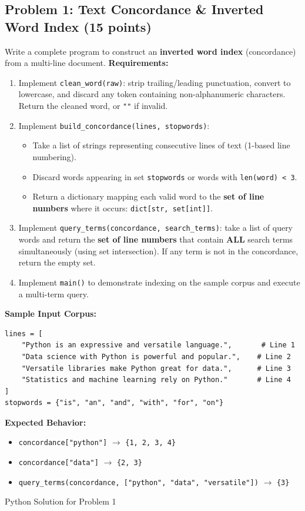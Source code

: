 \documentclass[11pt,a4paper]{article}
\begin{document}
\subsection*{Problem 1: Text Concordance \& Inverted Word Index (15 points)}
Write a complete program to construct an \textbf{inverted word index} (concordance) from a multi-line document.
\textbf{Requirements:}
\begin{enumerate}[label=\arabic*.,leftmargin=2em,itemsep=1.5pt]
\item Implement \texttt{clean\_word(raw)}: strip trailing/leading punctuation, convert to lowercase, and discard any token containing non-alphanumeric characters. Return the cleaned word, or \texttt{""} if invalid.
\item Implement \texttt{build\_concordance(lines, stopwords)}:
  \begin{itemize}
  \item Take a list of strings representing consecutive lines of text (1-based line numbering).
  \item Discard words appearing in set \texttt{stopwords} or words with \texttt{len(word) < 3}.
  \item Return a dictionary mapping each valid word to the \textbf{set of line numbers} where it occurs: \texttt{dict[str, set[int]]}.
  \end{itemize}
\item Implement \texttt{query\_terms(concordance, search\_terms)}: take a list of query words and return the \textbf{set of line numbers} that contain \textbf{ALL} search terms simultaneously (using set intersection). If any term is not in the concordance, return the empty set.
\item Implement \texttt{main()} to demonstrate indexing on the sample corpus and execute a multi-term query.
\end{enumerate}
\textbf{Sample Input Corpus:}\\[-0.1em]
\begin{lstlisting}
lines = [
    "Python is an expressive and versatile language.",       # Line 1
    "Data science with Python is powerful and popular.",    # Line 2
    "Versatile libraries make Python great for data.",      # Line 3
    "Statistics and machine learning rely on Python."       # Line 4
]
stopwords = {"is", "an", "and", "with", "for", "on"}
\end{lstlisting}
\textbf{Expected Behavior:}
\begin{itemize}
\item \texttt{concordance["python"]} $\rightarrow$ \texttt{\{1, 2, 3, 4\}}
\item \texttt{concordance["data"]} $\rightarrow$ \texttt{\{2, 3\}}
\item \texttt{query\_terms(concordance, ["python", "data", "versatile"])} $\rightarrow$ \texttt{\{3\}}
\end{itemize}
\begin{answerbox}[height=8.5cm]{Python Solution for Problem 1}\end{answerbox}
\newpage
\end{document}
